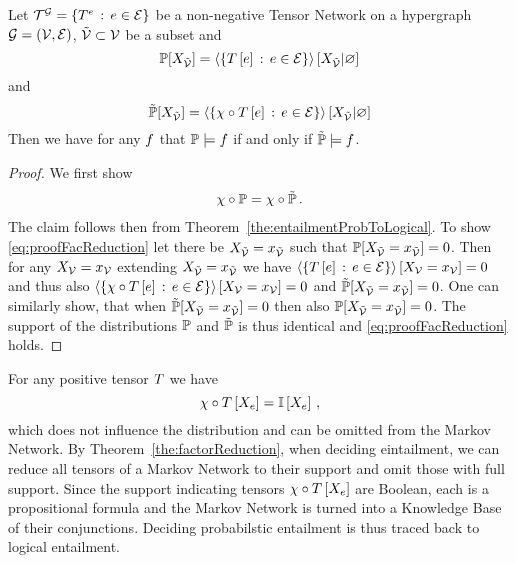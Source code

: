 \begin{theorem}\label{the:factorReduction}
	Let $\mathcal{T}^{\mathcal{G}}=\{T^{e}\, : \, e\in\mathcal{E}\}$ be a non-negative Tensor Network on a hypergraph $\mathcal{G}=(\mathcal{V},\mathcal{E})$, $\tilde{\mathcal{V}}\subset\mathcal{V}$ be a subset and
		\[ \mathbb{P}[X_{\tilde{\mathcal{V}}}] = \left\langle \{T\left[e\right] \, : \, e\in\mathcal{E} \}\right\rangle \left[ X_{\tilde{\mathcal{V}}} | \varnothing \right] \]
	and
		\[ \tilde{\mathbb{P}}[X_{\tilde{\mathcal{V}}}] = \left\langle \{\chi \circ T\left[e\right] \, : \, e\in\mathcal{E} \}\right\rangle \left[ X_{\tilde{\mathcal{V}}} | \varnothing \right] \]
	Then we have for any $f$ that $\mathbb{P}\models f$ if and only if $\tilde{\mathbb{P}}\models f$.
\end{theorem}
\begin{proof}
	We first show
	\begin{align}\label{eq:proofFacReduction}
		 \chi\circ\mathbb{P} = \chi\circ\tilde{\mathbb{P}} \, . 
	\end{align}
	The claim follows then from Theorem~\ref{the:entailmentProbToLogical}.
	To show \eqref{eq:proofFacReduction} let there be $X_{\tilde{\mathcal{V}}}=x_{\tilde{\mathcal{V}}}$ such that $\mathbb{P}[X_{\tilde{\mathcal{V}}}=x_{\tilde{\mathcal{V}}}]=0$.
	Then for any $X_{\mathcal{V}}=x_{\mathcal{V}}$ extending  $X_{\tilde{\mathcal{V}}}=x_{\tilde{\mathcal{V}}}$ we have $\left\langle \{T\left[e\right] \, : \, e\in\mathcal{E} \}\right\rangle \left[ X_{\mathcal{V}}=x_{\mathcal{V}} \right] = 0$ and thus also $\left\langle \{\chi\circ T\left[e\right] \, : \, e\in\mathcal{E} \}\right\rangle \left[ X_{\mathcal{V}}=x_{\mathcal{V}} \right] = 0$ and $\tilde{\mathbb{P}}[X_{\tilde{\mathcal{V}}}=x_{\tilde{\mathcal{V}}}]=0$.
	One can similarly show, that when $\tilde{\mathbb{P}}[X_{\tilde{\mathcal{V}}}=x_{\tilde{\mathcal{V}}}]=0$ then also ${\mathbb{P}}[X_{\tilde{\mathcal{V}}}=x_{\tilde{\mathcal{V}}}]=0$. 
	The support of the distributions $\mathbb{P}$ and $\tilde{\mathbb{P}}$ is thus identical and \eqref{eq:proofFacReduction} holds.
\end{proof}

For any positive tensor $T$ we have
	\[ \chi\circ T\left[X_{e}\right] = \mathbb{I}\left[X_{e}\right] \, , \]
which does not influence the distribution and can be omitted from the Markov Network.
By Theorem~\ref{the:factorReduction}, when deciding eintailment, we can reduce all tensors of a Markov Network to their support and omit those with full support.
Since the support indicating tensors $\chi\circ T\left[X_{e}\right]$ are Boolean, each is a propositional formula and the Markov Network is turned into a Knowledge Base of their conjunctions.
Deciding probabilstic entailment is thus traced back to logical entailment.

